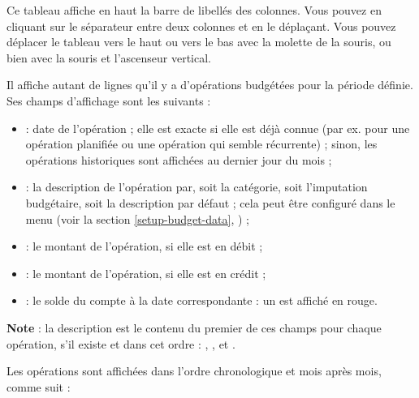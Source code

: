 Ce tableau affiche en haut la barre de libellés des colonnes. Vous pouvez  en cliquant sur le séparateur entre deux colonnes et en le déplaçant. Vous pouvez déplacer le tableau vers le haut ou vers le bas avec la molette de la souris, ou bien avec la souris et l'ascenseur vertical.
 

Il affiche autant de lignes qu'il y a d'opérations budgétées pour la période définie. Ses champs d'affichage sont les suivants :

\begin{itemize}
	\item{} : date de l'opération ; elle est exacte si elle est déjà connue (par ex. pour une opération planifiée ou une opération qui semble récurrente) ; sinon, les opérations historiques sont affichées au dernier jour du mois ; 
	\item {} : la description de l'opération par, soit la catégorie, soit l'imputation budgétaire, soit la description par défaut ; cela peut être configuré dans le menu  (voir la section \vref{setup-budget-data}, ) ;
	\item {} : le montant de l'opération, si elle est en débit ;
	\item {} : le montant de l'opération, si elle est en crédit ;
	\item {} : le solde du compte à la date correspondante : un  est affiché en rouge{\couleur}.
\end{itemize}

\textbf{Note} : la description  est le contenu du premier de ces champs pour chaque opération, s'il existe et dans cet ordre : , ,  et .
 

Les opérations sont affichées dans l'ordre chronologique et mois après mois, comme suit :

